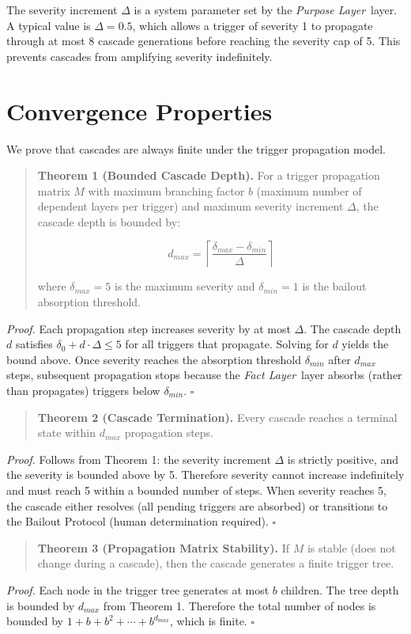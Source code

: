 \documentclass[12pt]{article}
\newcommand{\purpose}{\textit{Purpose Layer}}
\newcommand{\fact}{\textit{Fact Layer}}
\begin{document}
The severity increment $\Delta$ is a system parameter set by the \purpose\ layer. A typical value is $\Delta = 0.5$, which allows a trigger of severity 1 to propagate through at most 8 cascade generations before reaching the severity cap of 5. This prevents cascades from amplifying severity indefinitely.

\section{Convergence Properties}
\label{sec:convergence}

We prove that cascades are always finite under the trigger propagation model.

\begin{quote}
\textbf{Theorem 1 (Bounded Cascade Depth).} For a trigger propagation matrix $M$ with maximum branching factor $b$ (maximum number of dependent layers per trigger) and maximum severity increment $\Delta$, the cascade depth is bounded by:

$$d_{max} = \left\lceil \frac{\delta_{max} - \delta_{min}}{\Delta} \right\rceil$$

where $\delta_{max} = 5$ is the maximum severity and $\delta_{min} = 1$ is the bailout absorption threshold.
\end{quote}
\textit{Proof.} Each propagation step increases severity by at most $\Delta$. The cascade depth $d$ satisfies $\delta_0 + d \cdot \Delta \leq 5$ for all triggers that propagate. Solving for $d$ yields the bound above. Once severity reaches the absorption threshold $\delta_{min}$ after $d_{max}$ steps, subsequent propagation stops because the \fact\ layer absorbs (rather than propagates) triggers below $\delta_{min}$. $\square$

\begin{quote}
\textbf{Theorem 2 (Cascade Termination).} Every cascade reaches a terminal state within $d_{max}$ propagation steps.
\end{quote}
\textit{Proof.} Follows from Theorem 1: the severity increment $\Delta$ is strictly positive, and the severity is bounded above by 5. Therefore severity cannot increase indefinitely and must reach 5 within a bounded number of steps. When severity reaches 5, the cascade either resolves (all pending triggers are absorbed) or transitions to the Bailout Protocol (human determination required). $\square$

\begin{quote}
\textbf{Theorem 3 (Propagation Matrix Stability).} If $M$ is stable (does not change during a cascade), then the cascade generates a finite trigger tree.
\end{quote}
\textit{Proof.} Each node in the trigger tree generates at most $b$ children. The tree depth is bounded by $d_{max}$ from Theorem 1. Therefore the total number of nodes is bounded by $1 + b + b^2 + \cdots + b^{d_{max}}$, which is finite. $\square$
\end{document}
